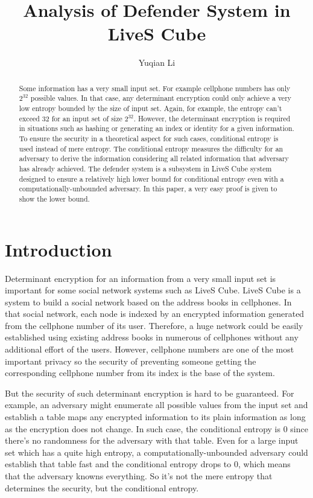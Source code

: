 \documentclass[10pt,a4paper]{article}
\author{Yuqian Li}
\title{Analysis of Defender System in LiveS Cube}
\date{}
\begin{document}
\maketitle
\begin{abstract}
	Some information has a very small input set. For example
	cellphone numbers has only $2^{32}$ possible values. In that case, any
	determinant encryption could only
	achieve a very low entropy bounded by the size of input set.
	Again, for example, the entropy can't exceed $32$ for an input set
	of size $2^{32}$. However, the determinant encryption is required
	in situations such as hashing or generating an index or identity for a
	given information. To ensure the security in a theoretical aspect
	for such cases, conditional entropy is used instead of mere entropy.
	The conditional entropy measures the difficulty for an adversary to
	derive the information considering all related information 
	that adversary has already achieved.
	The defender system is a subsystem in LiveS Cube system
	designed to ensure a relatively high lower
	bound for conditional entropy even with a computationally-unbounded adversary.
	In this paper, a very easy proof is given to show the lower bound.
\end{abstract}

\section{Introduction}
	Determinant encryption for an information from
	a very small input set is important for some social
	network systems such as LiveS Cube. LiveS Cube is a system to
	build a social network based on the address books in cellphones.
	In that social network, each node is indexed by an encrypted information generated
	from the cellphone number
	of its user. Therefore, a huge network could be easily established
	using existing address books in numerous of cellphones without
	any additional effort of the users. However, cellphone numbers are
	one of the most important privacy so the security of preventing
	someone getting the corresponding cellphone number from its index 
	is the base of the system.
	
	But the security
	of such determinant encryption is hard to be guaranteed. For example, an
	adversary might enumerate all possible values from the
	input set and establish a table maps any encrypted
	information to its plain information as long as the encryption
	does not change. In such case, the conditional entropy
	is $0$ since there's no randomness for the adversary with that table.
	Even for a large input set which has a quite high entropy, a
	computationally-unbounded adversary could establish that table
	fast and the conditional entropy drops to $0$, which means that the
	adversary knowns everything. So it's not the mere entropy that
	determines the security, but the conditional entropy.
	
\end{document}
